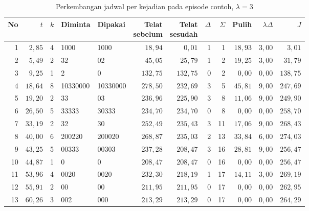 \begin{table}[htbp]
\caption{Perkembangan jadwal per kejadian pada episode contoh, $\lambda = 3$}
\label{tab:episode-lam3}
\centering\footnotesize
\setlength{\tabcolsep}{4pt}
\begin{adjustbox}{max width=\textwidth}
\begin{tabular}{rrcllrrrrrrr}
\toprule
No & $t$ & $k$ & Diminta & Dipakai & \shortstack[r]{Telat\\sebelum} & \shortstack[r]{Telat\\sesudah} & $\Delta$ & $\Sigma$ & Pulih & $\lambda\Delta$ & $J$ \\
\midrule
1 & $2{,}85$ & 4 & 1000 & 1000 & $18{,}94$ & $0{,}01$ & 1 & 1 & $18{,}93$ & $3{,}00$ & $3{,}01$ \\
2 & $5{,}49$ & 2 & 32 & 02 & $45{,}05$ & $25{,}79$ & 1 & 2 & $19{,}25$ & $3{,}00$ & $31{,}79$ \\
3 & $9{,}25$ & 1 & 2 & 0 & $132{,}75$ & $132{,}75$ & 0 & 2 & $0{,}00$ & $0{,}00$ & $138{,}75$ \\
4 & $18{,}64$ & 8 & 10330000 & 10330000 & $278{,}50$ & $232{,}69$ & 3 & 5 & $45{,}81$ & $9{,}00$ & $247{,}69$ \\
5 & $19{,}20$ & 2 & 33 & 03 & $236{,}96$ & $225{,}90$ & 3 & 8 & $11{,}06$ & $9{,}00$ & $249{,}90$ \\
6 & $26{,}50$ & 5 & 33333 & 30333 & $234{,}70$ & $234{,}70$ & 0 & 8 & $0{,}00$ & $0{,}00$ & $258{,}70$ \\
7 & $33{,}19$ & 2 & 32 & 30 & $252{,}49$ & $235{,}43$ & 3 & 11 & $17{,}06$ & $9{,}00$ & $268{,}43$ \\
8 & $40{,}00$ & 6 & 200220 & 200020 & $268{,}87$ & $235{,}03$ & 2 & 13 & $33{,}84$ & $6{,}00$ & $274{,}03$ \\
9 & $43{,}25$ & 5 & 00333 & 00303 & $237{,}28$ & $208{,}47$ & 3 & 16 & $28{,}81$ & $9{,}00$ & $256{,}47$ \\
10 & $44{,}87$ & 1 & 0 & 0 & $208{,}47$ & $208{,}47$ & 0 & 16 & $0{,}00$ & $0{,}00$ & $256{,}47$ \\
11 & $53{,}96$ & 4 & 0020 & 0020 & $232{,}30$ & $218{,}19$ & 1 & 17 & $14{,}11$ & $3{,}00$ & $269{,}19$ \\
12 & $55{,}91$ & 2 & 00 & 00 & $211{,}95$ & $211{,}95$ & 0 & 17 & $0{,}00$ & $0{,}00$ & $262{,}95$ \\
13 & $60{,}26$ & 3 & 002 & 000 & $213{,}29$ & $213{,}29$ & 0 & 17 & $0{,}00$ & $0{,}00$ & $264{,}29$ \\

\end{tabular}
\end{adjustbox}
\end{table}
